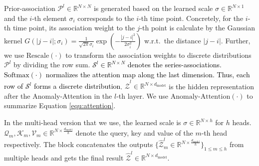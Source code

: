 \documentclass{article} %
\newcommand{\update}[1]{{\textcolor{black}{#1}}}
\begin{document}
Prior-association $\mathcal{P}^{l}\in\mathbb{R}^{N\times N}$ is generated based on the learned scale $\sigma\in\mathbb{R}^{N\times 1}$ and the $i$-th element $\sigma_i$ corresponds to the $i$-th time point. 
Concretely, for the $i$-th time point, its association weight to the $j$-th point is calculate by the Gaussian kernel $G(|j-i|;\sigma_i)=\frac{1}{\sqrt{2\pi}\sigma_i}\exp(-\frac{|j-i|^{2}}{2{\sigma_i^2}})$ w.r.t.~the distance $|j-i|$.
Further, we use $\mathrm{Rescale}(\cdot)$ to transform the association weights to discrete distributions $\mathcal{P}^l$ by dividing the row sum.
\update{$\mathcal{S}^{l}\in\mathbb{R}^{N\times N}$ denotes the series-associations. $\mathrm{Softmax(\cdot)}$ normalizes the attention map along the last dimension. Thus, each row of $\mathcal{S}^{l}$ forms a discrete distribution}. 
${\widehat{\mathcal{Z}}}^{l} \in\mathbb{R}^{N\times d_{\text{model}}}$ is the hidden representation after the Anomaly-Attention in the $l$-th layer. We use $\mathrm{Anomaly}\textit{-}\mathrm{Attention}(\cdot)$ to summarize Equation \ref{equ:attention}. %

In the multi-head version that we use, the learned scale is $\sigma\in\mathbb{R}^{N\times h}$ for $h$ heads. $\mathcal{Q}_{m},\mathcal{K}_{m},\mathcal{V}_{m}\in\mathbb{R}^{N\times\frac{d_{\text{model}}}{h}}$ denote the query, key and value of the $m$-th head respectively. The block concatenates the outputs $\{{\widehat{\mathcal{Z}}}_{m}^{l}\in\mathbb{R}^{N\times\frac{d_{\text{model}}}{h}}\}_{1\leq m\leq h}$ from multiple heads and gets the final result ${\widehat{\mathcal{Z}}}^{l}\in\mathbb{R}^{N\times d_{\text{model}}}$.
\end{document}
